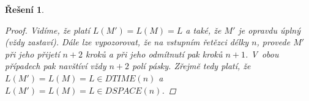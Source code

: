 \documentclass[a4paper]{article}
\let\var\mathit
\newcommand{\dtime}[1]{\var{DTIME}(#1)}
\newcommand{\dspace}[1]{\var{DSPACE}(#1)}
\theoremstyle{result}
\newtheorem*{result}{Řešení}
\begin{document}
\begin{enumerate}
\begin{result}
\begin{proof}
            Vidíme, že platí $L(M') = L(M) = L$ a také, že $M'$ je opravdu úplný (vždy zastaví). Dále lze vypozorovat, že na vstupním řetězci délky $n$, provede $M'$ při jeho přijetí $n + 2$ kroků a při jeho odmítnutí pak kroků $n + 1$. V~obou případech pak navštíví vždy $n + 2$ polí pásky. Zřejmě tedy platí, že $L(M') = L(M) = L \in \dtime{n}$ a $L(M') = L(M) = L \in \dspace{n}$.
        \end{proof}
    \end{result}


    
\end{enumerate}
\end{document}
